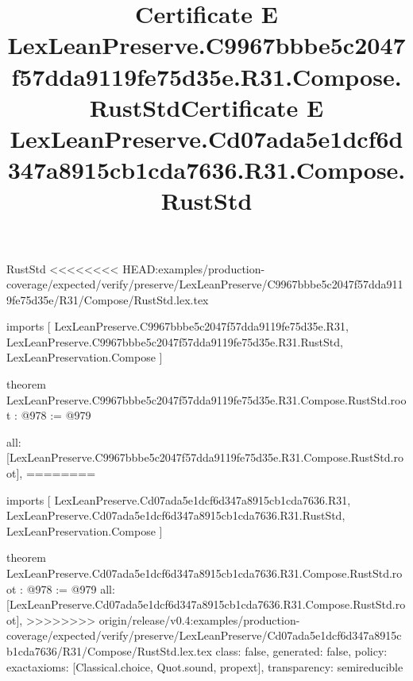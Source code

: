 \begin{lexlean}{RustStd}
<<<<<<<< HEAD:examples/production-coverage/expected/verify/preserve/LexLeanPreserve/C9967bbbe5c2047f57dda9119fe75d35e/R31/Compose/RustStd.lex.tex
\title{Certificate E LexLeanPreserve.C9967bbbe5c2047f57dda9119fe75d35e.R31.Compose.RustStd}
\begin{coremodule}
imports [
  LexLeanPreserve.C9967bbbe5c2047f57dda9119fe75d35e.R31,
  LexLeanPreserve.C9967bbbe5c2047f57dda9119fe75d35e.R31.RustStd,
  LexLeanPreservation.Compose
]

theorem LexLeanPreserve.C9967bbbe5c2047f57dda9119fe75d35e.R31.Compose.RustStd.root : @978 := @979 {
  all: [LexLeanPreserve.C9967bbbe5c2047f57dda9119fe75d35e.R31.Compose.RustStd.root],
========
\title{Certificate E LexLeanPreserve.Cd07ada5e1dcf6d347a8915cb1cda7636.R31.Compose.RustStd}
\begin{coremodule}
imports [
  LexLeanPreserve.Cd07ada5e1dcf6d347a8915cb1cda7636.R31,
  LexLeanPreserve.Cd07ada5e1dcf6d347a8915cb1cda7636.R31.RustStd,
  LexLeanPreservation.Compose
]

theorem LexLeanPreserve.Cd07ada5e1dcf6d347a8915cb1cda7636.R31.Compose.RustStd.root : @978 := @979 {
  all: [LexLeanPreserve.Cd07ada5e1dcf6d347a8915cb1cda7636.R31.Compose.RustStd.root],
>>>>>>>> origin/release/v0.4:examples/production-coverage/expected/verify/preserve/LexLeanPreserve/Cd07ada5e1dcf6d347a8915cb1cda7636/R31/Compose/RustStd.lex.tex
  class: false,
  generated: false,
  policy: exact{axioms: [Classical.choice, Quot.sound, propext]},
  transparency: semireducible
}


\end{coremodule}}
\end{coremodule}
\end{lexlean}
